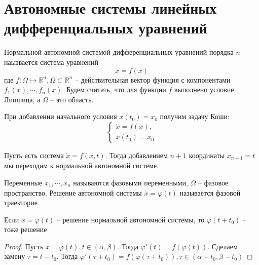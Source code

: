 \documentclass[document.tex]{subfiles}
\begin{document}
\section{Автономные системы линейных дифференциальных уравнений}
\begin{definition}
    Нормальной автономной системой дифференциальных уравнений порядка $n$ наызвается система уравнений
    \begin{equation}
        \label{norm-eq}
        \dot x = f(x)
    \end{equation}
    где $f: \Omega \mapsto \mathbb{R}^n, \Omega \subset \mathbb{R}^n$ -- действительная вектор функция с компонентами $f_1(x), \cdots, f_n(x)$. Будем считать, что для функции $f$ выполнено условие Липшица, а $\Omega$ -- это область.

    При добавлении начального условия $x(t_0) = x_0$ получим задачу Коши:
    \begin{equation}
        \label{cauchy-eq}
        \begin{cases}
            \dot x = f(x), \\
            x(t_0) = x_0
        \end{cases}
    \end{equation}
\end{definition}

\begin{remark}
    Пусть есть система $\dot x = f(x, t)$. Тогда добавлением $n+1$ координаты $x_{n + 1} = t$ мы переходим к нормальной
    автономной системе.
\end{remark}

\begin{definition}
    Переменные $x_1, \cdots, x_n$ называются фазовыми переменными, $\Omega$ -- фазовое пространство. Решение автономной
    системы $x = \varphi(t)$ называется фазовой траекторие.
\end{definition}


\begin{statement}
    \label{time_shift}
    Если $x = \varphi(t)$ -- решение нормальной автономной системы, то $\varphi(t + t_0)$ -- тоже решение
\end{statement}

\begin{proof}
    Пусть $x = \varphi(t), t \in (\alpha, \beta)$. Тогда $\varphi'(t) = f(\varphi(t))$. Сделаем замену $\tau = t - t_0$.
    Тогда $\varphi'(\tau + t_0) = f(\varphi(\tau + t_0)), \tau \in (\alpha - t_0, \beta - t_0)$
\end{proof}
\end{document}
